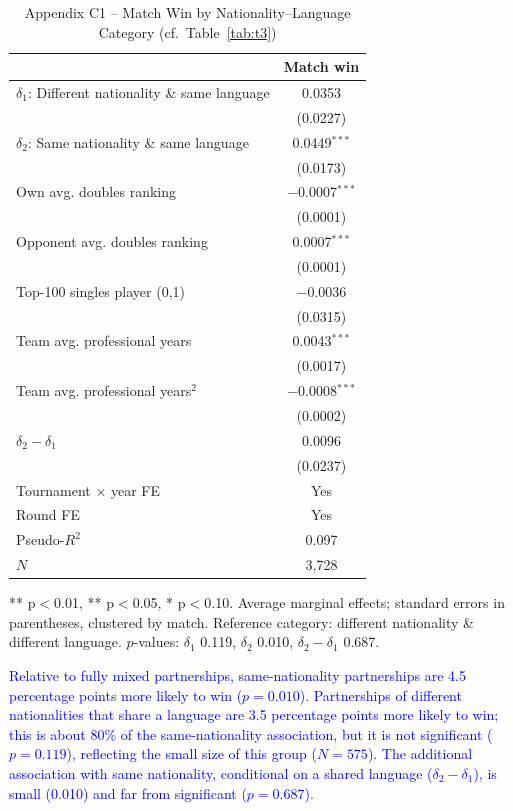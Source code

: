 \documentclass[10pt]{article}
\begin{document}
\begin{table}[htbp]
\color{blue}
\centering
\caption{Appendix C1 -- Match Win by Nationality--Language Category (cf.\ Table~\ref{tab:t3}) \label{tab:c1}}
\begin{threeparttable}
\begin{tabular}{lc}
\toprule
 & Match win \\
\midrule
$\delta_1$: Different nationality \& same language & 0.0353 \\
 & (0.0227) \\
$\delta_2$: Same nationality \& same language & 0.0449$^{***}$ \\
 & (0.0173) \\
Own avg. doubles ranking & $-$0.0007$^{***}$ \\
 & (0.0001) \\
Opponent avg. doubles ranking & 0.0007$^{***}$ \\
 & (0.0001) \\
Top-100 singles player (0,1) & $-$0.0036 \\
 & (0.0315) \\
Team avg. professional years & 0.0043$^{***}$ \\
 & (0.0017) \\
Team avg. professional years$^2$ & $-$0.0008$^{***}$ \\
 & (0.0002) \\
\midrule
$\delta_2-\delta_1$ & 0.0096 \\
 & (0.0237) \\
\midrule
Tournament $\times$ year FE & Yes \\
Round FE & Yes \\
Pseudo-$R^2$ & 0.097 \\
$N$ & 3,728 \\
\bottomrule
\end{tabular}
\begin{tablenotes}
\small
\item *** p$<$0.01, ** p$<$0.05, * p$<$0.10. Average marginal effects; standard errors in parentheses, clustered by match. Reference category: different nationality \& different language. $p$-values: $\delta_1$ 0.119, $\delta_2$ 0.010, $\delta_2-\delta_1$ 0.687.
\end{tablenotes}
\end{threeparttable}
\end{table}
\FloatBarrier

\textcolor{blue}{Relative to fully mixed partnerships, same-nationality partnerships are 4.5 percentage points more likely to win ($p=0.010$). Partnerships of different nationalities that share a language are 3.5 percentage points more likely to win; this is about 80\% of the same-nationality association, but it is not significant ($p=0.119$), reflecting the small size of this group ($N=575$). The additional association with same nationality, conditional on a shared language ($\delta_2-\delta_1$), is small (0.010) and far from significant ($p=0.687$).}





\end{document}
